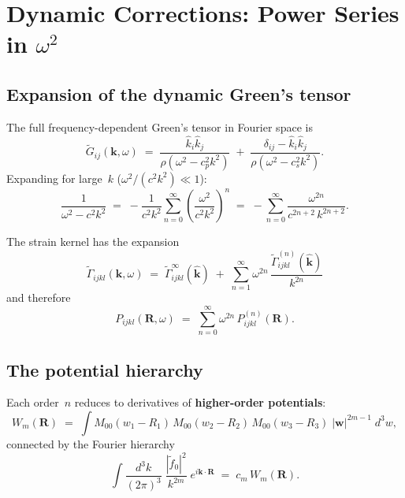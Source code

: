 \documentclass[11pt,a4paper]{article}
\newcommand{\bR}{\bm{R}}
\newcommand{\bk}{\bm{k}}
\newcommand{\bw}{\bm{w}}
\newcommand{\kh}{\hat{\bm{k}}}
\theoremstyle{plain}
\theoremstyle{remark}
\begin{document}
\section{Dynamic Corrections: Power Series in $\omega^2$}
\label{sec:dynamic}

\subsection{Expansion of the dynamic Green's tensor}

The full frequency-dependent Green's tensor in Fourier space is
\begin{equation}
  \tilde{G}_{ij}(\bk,\omega) \;=\;
  \frac{\hat{k}_i\hat{k}_j}%
       {\rho(\omega^2 - c_p^2 k^2)}
  \;+\;
  \frac{\delta_{ij} - \hat{k}_i\hat{k}_j}%
       {\rho(\omega^2 - c_s^2 k^2)}.
  \label{eq:Gij-dynamic}
\end{equation}
Expanding for large~$k$ ($\omega^2/(c^2 k^2) \ll 1$):
\begin{equation}
  \frac{1}{\omega^2 - c^2 k^2}
  \;=\;
  -\frac{1}{c^2 k^2}
  \sum_{n=0}^{\infty}
  \left(\frac{\omega^2}{c^2 k^2}\right)^{\!n}
  \;=\;
  -\sum_{n=0}^{\infty}
  \frac{\omega^{2n}}{c^{2n+2}\,k^{2n+2}}.
  \label{eq:geometric-series}
\end{equation}

The strain kernel has the expansion
\begin{equation}
  \boxed{
  \tilde{\Gamma}_{ijkl}(\bk,\omega)
  \;=\;
  \tilde{\Gamma}^\infty_{ijkl}(\kh)
  \;+\;
  \sum_{n=1}^{\infty}
  \omega^{2n}\,
  \frac{\tilde{\Gamma}^{(n)}_{ijkl}(\kh)}{k^{2n}}
  }
  \label{eq:Gamma-expansion}
\end{equation}
and therefore
\begin{equation}
  P_{ijkl}(\bR,\omega)
  \;=\;
  \sum_{n=0}^{\infty}
  \omega^{2n}\,P^{(n)}_{ijkl}(\bR).
  \label{eq:P-series}
\end{equation}

\subsection{The potential hierarchy}

Each order~$n$ reduces to derivatives of \textbf{higher-order
potentials}:
\begin{equation}
  W_m(\bR) \;=\;
  \int M_{00}(w_1-R_1)\,M_{00}(w_2-R_2)\,M_{00}(w_3-R_3)\;
  |\bw|^{2m-1}\;d^3w,
  \label{eq:Wm-def}
\end{equation}
connected by the Fourier hierarchy
\begin{equation}
  \int\!\frac{d^3k}{(2\pi)^3}\;
  \frac{|\tilde{f}_0|^2}{k^{2m}}\;e^{i\bk\cdot\bR}
  \;=\; c_m\,W_m(\bR).
  \label{eq:FT-hierarchy}
\end{equation}
\end{document}
